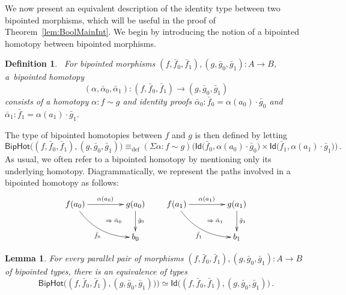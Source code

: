 \documentclass[reqno,10pt,a4paper,oneside]{amsart}
\numberwithin{equation}{section}
\theoremstyle{mythm}
\newtheorem{lemma}[theorem]{Lemma}
\theoremstyle{mydef}
\newtheorem{definition}[theorem]{Definition}
\theoremstyle{myrmk}
\newcommand{\deq}{\equiv}
\newcommand{\defeq}{\deq_{\mathrm{def}}}
\newcommand{\co}{\colon}
\newcommand{\ct}{\cdot}
\newcommand{\Id}{\mathsf{Id}}
\newcommand{\BipHot}{\mathsf{BipHot}}
\begin{document}
We now present an equivalent description of the identity type between two bipointed morphisms, which 
will be useful in the proof of Theorem~\ref{lem:BoolMainInt}. We begin by introducing the notion of a bipointed homotopy between bipointed morphisms.





\begin{definition}\ \label{thm:biphomotopy} For bipointed morphisms $(f, \bar{f}_0, \bar{f}_1) , (g, \bar{g}_0, \bar{g}_1) \co A \to B$, a~\emph{bipointed homotopy} 
\[
(\alpha, \bar{\alpha}_0, \bar{\alpha}_1) \co (f, \bar{f}_0, \bar{f}_1) \to  (g, \bar{g}_0, \bar{g}_1)
\] 
consists of a homotopy $\alpha \co  f \sim g$ and identity proofs
$\bar{\alpha}_0 \co  \bar{f}_0 = \alpha(a_0)  \cdot \bar{g}_0 $ and $\bar{\alpha}_1 \co \bar{f}_1 =  \alpha(a_1) \cdot \bar{g}_1$. 
\end{definition}

The type of bipointed homotopies between $f$ and $g$ is then defined by letting
\[
 \BipHot  \big( (f,\bar{f}_0, \bar{f}_1), (g, \bar{g}_0, \bar{g}_1) \big)   \defeq   
 (\Sigma \alpha \co f \sim g)  \big( 
  \Id\big( \bar{f}_0 ,  \alpha(a_0)  \ct \bar{g}_0 \big) \times 
  \Id \big( \bar{f}_1,  \alpha(a_1) \ct  \bar{g}_1 \big) \big) \, .
\]
As usual, we often refer to a bipointed homotopy by mentioning only its underlying homotopy.
Diagrammatically, we represent the paths involved in a bipointed homotopy as follows:
\[
\xymatrix@C=1.5cm{
f(a_0) \ar[r]^{\alpha(a_0)}  \ar@/_1pc/[dr]_{\bar{f}_0}  
\ar@{}[dr]|{\qquad \Rightarrow \; \bar{\alpha}_0}  & g(a_0) \ar[d]^{\bar{g}_0}  \\ 
 & b_0 } \qquad
 \xymatrix@C=1.5cm{
f(a_1) \ar[r]^{\alpha(a_1)}  \ar@/_1pc/[dr]_{\bar{f}_1}  
\ar@{}[dr]|{\qquad \Rightarrow \; \bar{\alpha}_1}  & g(a_1) \ar[d]^{\bar{g}_1}  \\ 
 & b_1 }
 \] 



\begin{lemma} \label{BoolHomSpace} 
For every parallel pair of morphisms $(f, \bar{f}_0, \bar{f}_1), (g, \bar{g}_0, \bar{g}_1) \co A \to B$ of bipointed types, there is an equivalence of types
\[
\BipHot\big( (f, \bar{f}_0, \bar{f}_1), (g, \bar{g}_0, \bar{g}_1) ) \big) \simeq 
\Id \big( (f, \bar{f}_0, \bar{f}_1), (g, \bar{g}_0, \bar{g}_1) \big)\, .
\]
\end{lemma}
\end{document}
